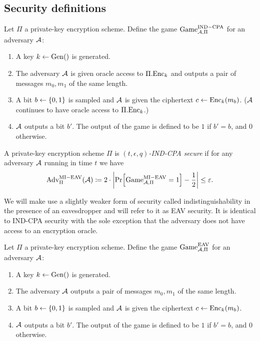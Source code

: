 \subsection{Security definitions}

\begin{definition}
	Let $\Pi$ a private-key encryption scheme. Define the game $\mathrm{Game}_{\mathcal{A}, \Pi}^{\mathrm{IND-CPA}}$ for an adversary $\mathcal{A}$:
	\begin{enumerate}[1.]
		\item A key $k \leftarrow \mathrm{Gen}()$ is generated.
		\item The adversary $\mathcal{A}$ is given oracle access to $\Pi.\mathrm{Enc}_k$ and outputs a pair of messages $m_0, m_1$ of the same length.
		\item A bit $b \leftarrow \{0, 1\}$ is sampled and $\mathcal{A}$ is given the ciphertext $c \leftarrow \mathrm{Enc}_k(m_b)$. ($\mathcal{A}$ continues to have oracle access to $\Pi.\mathrm{Enc}_k$.)
		\item $\mathcal{A}$ outputs a bit $b'$. The output of the game is defined to be $1$ if $b' = b$, and $0$ otherwise.
	\end{enumerate}
\end{definition}

\begin{definition}
	A private-key encryption scheme $\Pi$ is \emph{$(t, \epsilon, q)$-IND-CPA secure} if for any adversary $\mathcal{A}$ running in time $t$ we have
	\begin{align*}
		\mathrm{Adv}_{\Pi}^{\mathrm{MI-EAV}}(\adv) \coloneqq 2 \cdot \abs*{\pr{\mathrm{Game}_{\adv, \Pi}^{\mathrm{MI-EAV}} = 1} - \frac{1}{2}} \le \epsilon.
	\end{align*}
\end{definition}

We will make use a slightly weaker form of security called indistinguishability in the presence of an eavesdropper and will refer to it as EAV security. It is identical to IND-CPA security with the sole exception that the adversary does not have access to an encryption oracle.

\begin{definition}
	Let $\Pi$ a private-key encryption scheme. Define the game $\mathrm{Game}_{\mathcal{A}, \Pi}^{\mathrm{EAV}}$ for an adversary $\mathcal{A}$:
	\begin{enumerate}[1.]
		\item A key $k \leftarrow \mathrm{Gen}()$ is generated.
		\item The adversary $\mathcal{A}$ outputs a pair of messages $m_0, m_1$ of the same length.
		\item A bit $b \leftarrow \{0, 1\}$ is sampled and $\mathcal{A}$ is given the ciphertext $c \leftarrow \mathrm{Enc}_k(m_b)$.
		\item $\mathcal{A}$ outputs a bit $b'$. The output of the game is defined to be $1$ if $b' = b$, and $0$ otherwise.
	\end{enumerate}
\end{definition}

